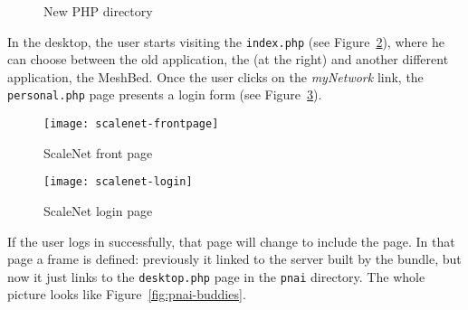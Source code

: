 \begin{figure}[htbp]
  \caption{New PHP directory}
  \label{fig:phpdir}
\end{figure}

In the desktop, the user starts visiting the \texttt{index.php} (see Figure~\ref{fig:scalenet-frontpage}), where he can choose between the old  application, the  (at the right) and another different application, the MeshBed.
Once the user clicks on the \emph{myNetwork} link, the \texttt{personal.php} page presents a login form (see Figure~\ref{fig:scalenet-login}).

\begin{figure}[htbp]
  \centering
    \texttt{[image: scalenet-frontpage]}
  \caption{ScaleNet front page}
  \label{fig:scalenet-frontpage}
\end{figure}

\begin{figure}[htbp]
  \centering
    \texttt{[image: scalenet-login]}
  \caption{ScaleNet login page}
  \label{fig:scalenet-login}
\end{figure}

If the user logs in successfully, that page will change to include the  page.
In that page a frame is defined: previously it linked to the server built by the  bundle, but now it just links to the \texttt{desktop.php} page in the \texttt{pnai} directory.
The whole picture looks like Figure~\ref{fig:pnai-buddies}.

